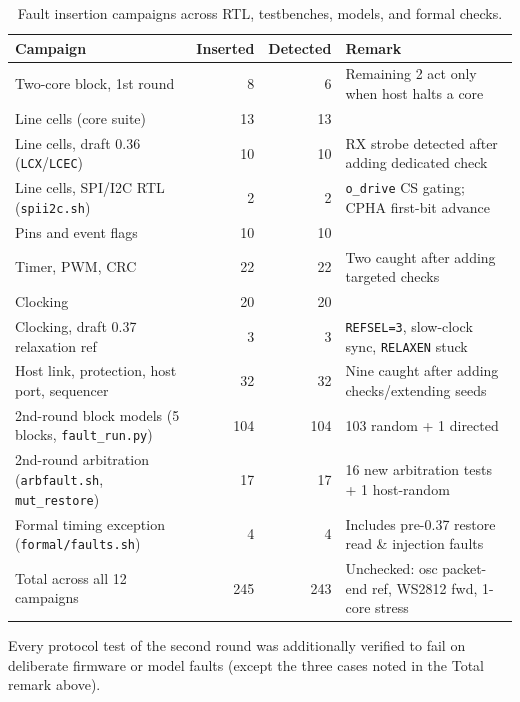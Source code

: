\documentclass[10pt,a4paper]{article}
\begin{document}
\begin{table}[H]
\centering\small
\begin{tabularx}{\linewidth}{@{}Lrrl@{}}
\toprule
Campaign & Inserted & Detected & Remark \\
\midrule
Two-core block, 1st round & 8 & 6 & Remaining 2 act only when host halts a core \\
Line cells (core suite) & 13 & 13 & \\
Line cells, draft 0.36 (\texttt{LCX}/\texttt{LCEC}) & 10 & 10 & RX strobe detected after adding dedicated check \\
Line cells, SPI/I2C RTL (\texttt{spii2c.sh}) & 2 & 2 & \texttt{o\_drive} CS gating; CPHA first-bit advance \\
Pins and event flags & 10 & 10 & \\
Timer, PWM, CRC & 22 & 22 & Two caught after adding targeted checks \\
Clocking & 20 & 20 & \\
Clocking, draft 0.37 relaxation ref & 3 & 3 & \texttt{REFSEL=3}, slow-clock sync, \texttt{RELAXEN} stuck \\
Host link, protection, host port, sequencer & 32 & 32 & Nine caught after adding checks/extending seeds \\
2nd-round block models (5 blocks, \texttt{fault\_run.py}) & 104 & 104 & 103 random + 1 directed \\
2nd-round arbitration (\texttt{arbfault.sh}, \texttt{mut\_restore}) & 17 & 17 & 16 new arbitration tests + 1 host-random \\
Formal timing exception (\texttt{formal/faults.sh}) & 4 & 4 & Includes pre-0.37 restore read \& injection faults \\
\midrule
Total across all 12 campaigns & 245 & 243 & Unchecked: osc packet-end ref, WS2812 fwd, 1-core stress \\
\bottomrule
\end{tabularx}
\caption{Fault insertion campaigns across RTL, testbenches, models, and formal checks.}
\end{table}

Every protocol test of the second round was additionally verified to fail on deliberate firmware or model faults
(except the three cases noted in the Total remark above).
\end{document}
